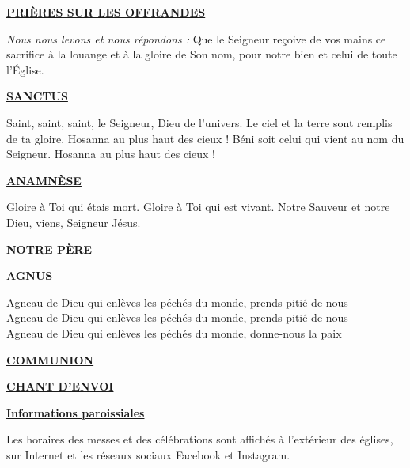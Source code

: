 \documentclass[11pt,a4paper]{article}
\newcommand{\NewsItem}[1]{%
\vspace{3pt}
\underline{\textbf{#1}}
		  }
\begin{document}
\NewsItem{PRIÈRES SUR LES OFFRANDES}
\textit{Nous nous levons et nous répondons : }
Que le Seigneur reçoive de vos mains ce sacrifice à la louange et à la gloire 
de Son nom, pour notre bien et celui de toute l’Église.

\NewsItem{SANCTUS}
Saint, saint, saint, le Seigneur, Dieu de l’univers.
Le ciel et la terre sont remplis de ta gloire. Hosanna au plus haut des cieux !
Béni soit celui qui vient au nom du Seigneur. Hosanna au plus haut des cieux !


\NewsItem{ANAMNÈSE}
Gloire à Toi qui étais mort. Gloire à Toi qui est vivant.  
Notre Sauveur et notre Dieu, viens, Seigneur Jésus.

\NewsItem{NOTRE PÈRE}

\NewsItem{AGNUS}

Agneau de Dieu qui enlèves les péchés du monde, prends pitié de nous\\
Agneau de Dieu qui enlèves les péchés du monde, prends pitié de nous\\
Agneau de Dieu qui enlèves les péchés du monde, donne-nous la paix

\NewsItem{COMMUNION}


\NewsItem{CHANT D'ENVOI}


\newpage


\NewsItem{Informations paroissiales}

Les horaires des messes et des célébrations sont affichés à l’extérieur des églises, 
sur Internet et les réseaux sociaux Facebook et Instagram.          
\end{document}
